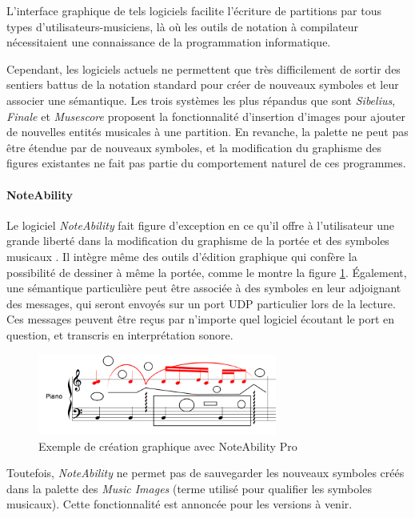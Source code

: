 L'interface graphique de tels logiciels facilite l'écriture de partitions par tous types d'utilisateurs-musiciens, là où les outils de notation à compilateur nécessitaient une connaissance de la programmation informatique.

Cependant, les logiciels actuels ne permettent que très difficilement de sortir des sentiers battus de la notation standard pour créer de nouveaux symboles et leur associer une sémantique. Les trois systèmes les plus répandus que sont \textit{Sibelius}, \textit{Finale} et \textit{Musescore} proposent la fonctionnalité d'insertion d'images pour ajouter de nouvelles entités musicales à une partition. En revanche, la palette ne peut pas être étendue par de nouveaux symboles, et la modification du graphisme des figures existantes ne fait pas partie du comportement naturel de ces programmes.

\paragraph{NoteAbility} Le logiciel \textit{NoteAbility} fait figure d'exception en ce qu'il offre à l'utilisateur une grande liberté dans la modification du graphisme de la portée et des symboles musicaux \cite{noteAbility2018}.
Il intègre même des outils d'édition graphique qui confère la possibilité de dessiner à même la portée, comme le montre la figure \ref{fig:exempleNoteAbility}.
Également, une sémantique particulière peut être associée à des symboles en leur adjoignant des messages, qui seront envoyés sur un port UDP particulier lors de la lecture. Ces messages peuvent être reçus par n'importe quel logiciel écoutant le port en question, et transcris en interprétation sonore.

\begin{figure}[H]
	\centering
	\includegraphics[keepaspectratio=true, width=0.7\textwidth]{OutilsInformatiques/i/exempleNoteAbility.png}
	\caption{Exemple de création graphique avec NoteAbility Pro}
	\label{fig:exempleNoteAbility}			
\end{figure}

Toutefois, \textit{NoteAbility} ne permet pas de sauvegarder les nouveaux symboles créés dans la palette des \textit{Music Images} (terme utilisé pour qualifier les symboles musicaux). Cette fonctionnalité est annoncée pour les versions à venir.      